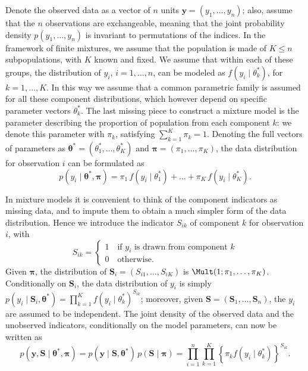 Denote the observed data as a vector of $n$ units $\bm{y} = (y_1,\dots,y_n)$; also, assume that the $n$ observations are exchangeable, meaning that the joint probability density $p(y_1,\dots,y_n)$ is invariant to permutations of the indices. In the framework of finite mixtures, we assume that the population is made of $K\leq n$ subpopulations, with $K$ known and fixed.
We assume that within each of these groups, the distribution of $y_i$, $i=1,\dots,n$, can be modeled as $f(y_i \mid \theta_k^*)$, for $k=1,\dots,K$. In this way we assume that a common parametric family is assumed for all these component distributions, which however depend on specific parameter vectors $\theta_k^*$.
The last missing piece to construct a mixture model is the parameter describing the proportion of population from each component $k$: we denote this parameter with $\pi_k$, satisfying $\sum_{k=1}^K \pi_k = 1$. Denoting the full vectors of parameters as $\bm{\theta}^* = (\theta_1^*,\dots,\theta_K^*)$ and $\bm{\pi} = (\pi_1,\dots,\pi_K)$, the data distribution for observation $i$ can be formulated as
\begin{equation*}
p(y_i\mid \bm{\theta}^*,\bm{\pi}) = \pi_1 \, f(y_i\mid\theta_1^*) + \dots + \pi_K \, f(y_i\mid\theta_K^*).
\end{equation*}

In mixture models it is convenient to think of the component indicators as missing data, and to impute them to obtain a much simpler form of the data distribution. Hence we introduce the indicator $S_{ik}$ of component $k$ for observation $i$, with 
\begin{equation*}
S_{ik} = \begin{cases}
1 \quad \text{if $y_i$ is drawn from component $k$}\\
0 \quad \text{otherwise}.
\end{cases}
\end{equation*}
Given $\bm{\pi}$, the distribution of $\bm{S}_i = (S_{i1},\dots,S_{iK})$ is $\Mult(1;\pi_1,\dots,\pi_K)$. 
Conditionally on $\bm{S}_{i}$, the data distribution of $y_i$ is simply $p(y_i\mid \bm{S}_i,\bm{\theta}^*) = \prod_{k=1}^K f(y_i\mid\theta_k^*)^{S_{ik}}$; moreover, given $\bm{S}=(\bm{S}_1,\dots,\bm{S}_n)$, the $y_i$ are assumed to be independent.
The joint density of the observed data and the unobserved indicators, conditionally on the model parameters, can now be written as 
\begin{equation*}
p(\bm{y},\bm{S}\mid \bm{\theta}^*,\bm{\pi}) = p(\bm{y}\mid\bm{S},\bm{\theta}^*)\, p(\bm{S}\mid\bm{\pi}) = 
\prod_{i=1}^n \prod_{k=1}^K \left\{ \pi_k f(y_i\mid\theta_k^*) \right\}^{S_{ik}}.
\end{equation*}

